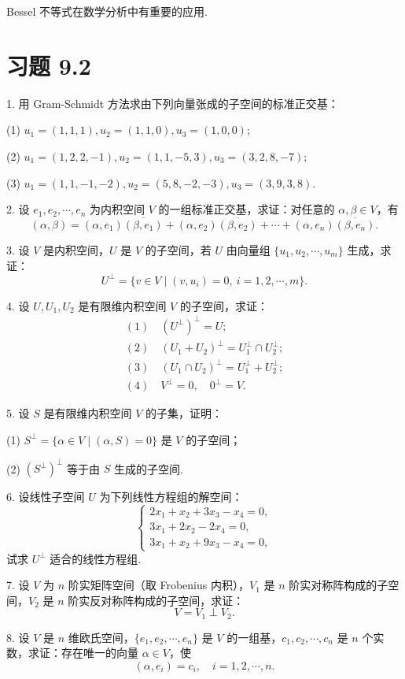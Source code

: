 \documentclass[UTF8, 12pt, fontset=fandol, oneside]{ctexart}
\begin{document}
Bessel 不等式在数学分析中有重要的应用.

\section*{习题 9.2}

1. 用 Gram-Schmidt 方法求由下列向量张成的子空间的标准正交基：

(1) $u_1=(1,1,1),u_2=(1,1,0),u_3=(1,0,0)$;

(2) $u_1=(1,2,2,-1),u_2=(1,1,-5,3),u_3=(3,2,8,-7)$;

(3) $u_1=(1,1,-1,-2),u_2=(5,8,-2,-3),u_3=(3,9,3,8)$.

2. 设 $e_1,e_2,\cdots,e_n$ 为内积空间 $V$ 的一组标准正交基，求证：对任意的 $\alpha,\beta\in V$，有
\[
  (\alpha,\beta)=(\alpha,e_1)\overline{(\beta,e_1)}
  +(\alpha,e_2)\overline{(\beta,e_2)}
  +\cdots
  +(\alpha,e_n)\overline{(\beta,e_n)}.
\]

3. 设 $V$ 是内积空间，$U$ 是 $V$ 的子空间，若 $U$ 由向量组 $\{u_1,u_2,\cdots,u_m\}$ 生成，求证：
\[
  U^\perp=\{v\in V\mid (v,u_i)=0,\ i=1,2,\cdots,m\}.
\]

4. 设 $U,U_1,U_2$ 是有限维内积空间 $V$ 的子空间，求证：
\[
\begin{gathered}
  (1)\quad (U^\perp)^\perp=U;\\
  (2)\quad (U_1+U_2)^\perp=U_1^\perp\cap U_2^\perp;\\
  (3)\quad (U_1\cap U_2)^\perp=U_1^\perp+U_2^\perp;\\
  (4)\quad V^\perp=0,\quad 0^\perp=V.
\end{gathered}
\]

5. 设 $S$ 是有限维内积空间 $V$ 的子集，证明：

(1) $S^\perp=\{\alpha\in V\mid (\alpha,S)=0\}$ 是 $V$ 的子空间；

(2) $(S^\perp)^\perp$ 等于由 $S$ 生成的子空间.

6. 设线性子空间 $U$ 为下列线性方程组的解空间：
\[
  \begin{cases}
    2x_1+x_2+3x_3-x_4=0,\\
    3x_1+2x_2-2x_4=0,\\
    3x_1+x_2+9x_3-x_4=0,
  \end{cases}
\]
试求 $U^\perp$ 适合的线性方程组.

7. 设 $V$ 为 $n$ 阶实矩阵空间（取 Frobenius 内积），$V_1$ 是 $n$ 阶实对称阵构成的子空间，$V_2$ 是 $n$ 阶实反对称阵构成的子空间，求证：
\[
  V=V_1\perp V_2.
\]

8. 设 $V$ 是 $n$ 维欧氏空间，$\{e_1,e_2,\cdots,e_n\}$ 是 $V$ 的一组基，$c_1,c_2,\cdots,c_n$ 是 $n$ 个实数，求证：存在唯一的向量 $\alpha\in V$，使
\[
  (\alpha,e_i)=c_i,\quad i=1,2,\cdots,n.
\]
\end{document}
